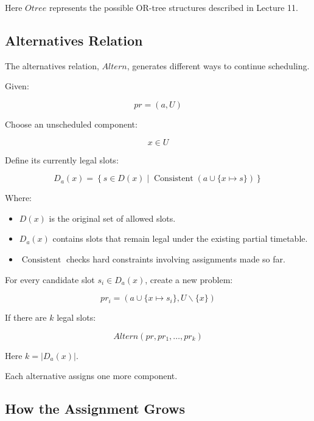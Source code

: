 \documentclass[11pt,letterpaper]{article}
\newcommand{\setminusop}{\mathbin{\backslash}}
\newcommand{\Consistent}{\operatorname{Consistent}}
\newcommand{\Altern}{\mathit{Altern}}
\begin{document}
Here $Otree$ represents the possible OR-tree
structures described in Lecture 11.

\subsection{Alternatives Relation}

The alternatives relation, $\Altern$,
generates different ways to continue scheduling.

Given:

\begin{equation}
pr=(a,U)
\end{equation}

Choose an unscheduled component:

\begin{equation}
x\in U
\end{equation}

Define its currently legal slots:

\begin{equation}
\boxed{
D_a(x)=
\left\{
s\in D(x)\mid
\Consistent(a\cup\{x\mapsto s\})
\right\}
}
\end{equation}

Where:

\begin{itemize}
    \item $D(x)$ is the original set of allowed slots.
    \item $D_a(x)$ contains slots that remain legal
    under the existing partial timetable.
    \item $\Consistent$ checks hard constraints
    involving assignments made so far.
\end{itemize}

For every candidate slot $s_i\in D_a(x)$,
create a new problem:

\begin{equation}
\boxed{
pr_i=
\left(
a\cup\{x\mapsto s_i\},
U\setminusop\{x\}
\right)
}
\end{equation}

If there are $k$ legal slots:

\begin{equation}
\boxed{
\Altern(pr,pr_1,\ldots,pr_k)
}
\end{equation}

Here $k=|D_a(x)|$.

Each alternative assigns one more component.

\subsection{How the Assignment Grows}
\end{document}
